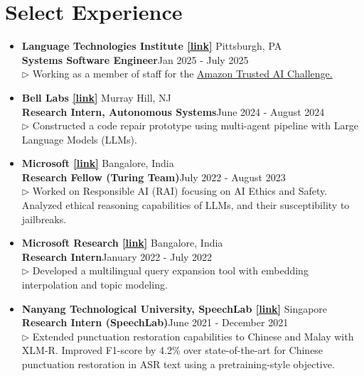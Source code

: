\documentclass[11pt,letterpaper]{article}
\begin{document}
    \section*{Select Experience}
    \begin{itemize}[leftmargin=*,label={},itemsep=4pt]
        \item \textbf{Language Technologies Institute  \href{https://lti.cs.cmu.edu}{[link]}} \hfill Pittsburgh, PA\\
            \textbf{ Systems Software Engineer}\hfill Jan 2025 - July 2025\\
            $\triangleright$ Working as a member of staff for the \href{https://www.amazon.science/nova-ai-challenge}{Amazon Trusted AI Challenge.}
            
        \item \textbf{Bell Labs  \href{https://www.bell-labs.com/}{[link]}} \hfill Murray Hill, NJ\\
            \textbf{ Research Intern, Autonomous
                    Systems}\hfill June 2024 - August 2024\\
            $\triangleright$ Constructed a code repair prototype using multi-agent pipeline with Large Language
                Models (LLMs).
        \item \textbf{Microsoft  \href{https://www.microsoft.com/en-in/research/theme/artificial-intelligence/}{[link]}} \hfill Bangalore, India\\
            \textbf{ Research Fellow (Turing Team)}\hfill July 2022 - August 2023\\
            $\triangleright$ Worked on Responsible AI (RAI) focusing on AI Ethics and Safety. Analyzed ethical
                reasoning capabilities of LLMs, and their susceptibility to jailbreaks.
        \item \textbf{Microsoft Research  \href{https://www.microsoft.com/en-us/research/}{[link]}} \hfill Bangalore, India\\
            \textbf{ Research Intern}\hfill January 2022 - July 2022\\
            $\triangleright$ Developed a multilingual query expansion tool with embedding interpolation and topic
                modeling.
        \item \textbf{Nanyang Technological University, SpeechLab  \href{https://www.ntu.edu.sg/speechlab}{[link]}} \hfill Singapore\\
            \textbf{ Research Intern (SpeechLab)}\hfill June 2021 - December 2021\\
            $\triangleright$ Extended punctuation restoration capabilities to Chinese and Malay with XLM-R.
                Improved F1-score by 4.2\% over state-of-the-art for Chinese punctuation restoration in ASR text using a
                pretraining-style objective.
    \end{itemize}
    
\end{document}
